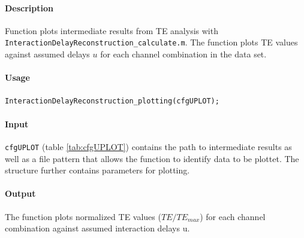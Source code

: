 \documentclass[a4paper,10pt]{article}
\begin{document}
\paragraph*{Description} Function plots intermediate results from TE analysis with \verb&InteractionDelayReconstruction_calculate.m&. The function plots TE values against assumed delays $u$ for each channel combination in the data set. 

\paragraph*{Usage} \texttt{InteractionDelayReconstruction\_plotting(cfgUPLOT);}

\paragraph*{Input} \texttt{cfgUPLOT} (table \ref{tab:cfgUPLOT}) contains the path to intermediate results as well as a file pattern that allows the function to identify data to be plottet. The structure further contains parameters for plotting.

\paragraph*{Output} The function plots normalized TE values ($TE/TE_{max}$) for each channel combination against assumed interaction delays u. 

\end{document}
